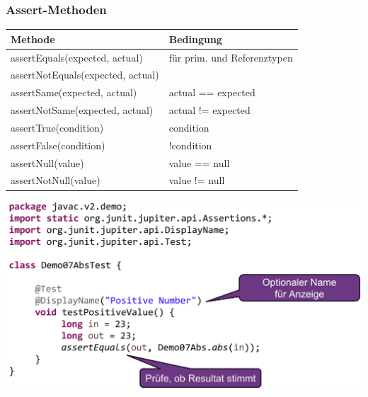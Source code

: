 {    \subsubsection{Assert-Methoden}
        \begin{center}
            \begin{tabular}{ll}
                \rowcolor[RGB]{239,239,239} 
                \textbf{Methode} & \textbf{Bedingung} \\ \hline
                assertEquals(expected, actual) & für prim. und Referenztypen \\
                assertNotEquals(expected, actual) & \\
                assertSame(expected, actual) & actual == expected\\
                assertNotSame(expected, actual) & actual != expected\\
                assertTrue(condition) & condition\\
                assertFalse(condition) & !condition\\
                assertNull(value) & value == null\\
                assertNotNull(value) & value != null\\
            \end{tabular}
        \end{center}
        \vspace{-0.5cm}

    \begin{center}
        \includegraphics[width=0.8\columnwidth]{pictures/testmethode.png}    
    \end{center}
    \vspace{-0.4cm} 

}
